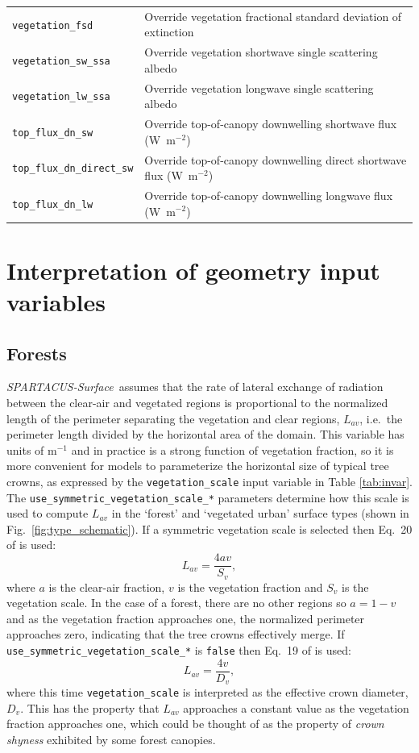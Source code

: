 \documentclass[a4,oneside]{article}
\def\codesize{\small}
\def\codetabsize{\footnotesize}
\def\spsurf{\emph{SPARTACUS-Surface}}
\def\code#1{{\codesize\texttt{#1}}}
\def\codetab#1{{\codetabsize\texttt{#1}}}
\begin{document}
{\begin{longtable}{ll}
\codetab{vegetation\_fsd} & Override vegetation fractional standard deviation of extinction\\
\codetab{vegetation\_sw\_ssa} & Override vegetation shortwave single scattering albedo \\
\codetab{vegetation\_lw\_ssa} & Override vegetation longwave single scattering albedo \\
\codetab{top\_flux\_dn\_sw} & Override top-of-canopy downwelling shortwave flux (W~m$^{-2}$)\\
\codetab{top\_flux\_dn\_direct\_sw} & Override top-of-canopy downwelling direct shortwave flux (W~m$^{-2}$)\\
\codetab{top\_flux\_dn\_lw} & Override top-of-canopy downwelling longwave flux (W~m$^{-2}$)\\
\hline
\end{longtable}
}

\section{Interpretation of geometry input variables}
\subsection{Forests}
\spsurf\ assumes that the rate of lateral exchange of radiation
between the clear-air and vegetated regions is proportional to the
normalized length of the perimeter separating the vegetation and clear
regions, $L_{av}$, i.e.\ the perimeter length divided by the horizontal
area of the domain. This variable has units of m$^{-1}$ and in
practice is a strong function of vegetation fraction, so it is more
convenient for models to parameterize the horizontal size of typical
tree crowns, as expressed by the \code{vegetation\_scale} input
variable in Table \ref{tab:invar}. The
\code{use\_symmetric\_vegetation\_scale\_*} parameters determine how
this scale is used to compute $L_{av}$ in the `forest' and `vegetated
urban' surface types (shown in Fig.\ \ref{fig:type_schematic}).  If a
symmetric vegetation scale is selected then Eq.\ 20 of
\cite{Hogan+2018} is used:
%
\begin{equation}
  L_{av}=\frac{4av}{S_v},\label{eq:S}
\end{equation}
%
where $a$ is the clear-air fraction, $v$ is the vegetation fraction
and $S_v$ is the vegetation scale.  In the case of a forest, there are
no other regions so $a=1-v$ and as the vegetation fraction approaches
one, the normalized perimeter approaches zero, indicating that the
tree crowns effectively merge. If
\code{use\_symmetric\_vegetation\_scale\_*} is \code{false} then
Eq.\ 19 of \cite{Hogan+2018} is used:
%
\begin{equation}
  L_{av}=\frac{4v}{D_v},\label{eq:D}
\end{equation}
%
where this time \code{vegetation\_scale} is interpreted as the
effective crown diameter, $D_v$. This has the property that $L_{av}$
approaches a constant value as the vegetation fraction approaches one,
which could be thought of as the property of \emph{crown shyness}
exhibited by some forest canopies.
\end{document}
